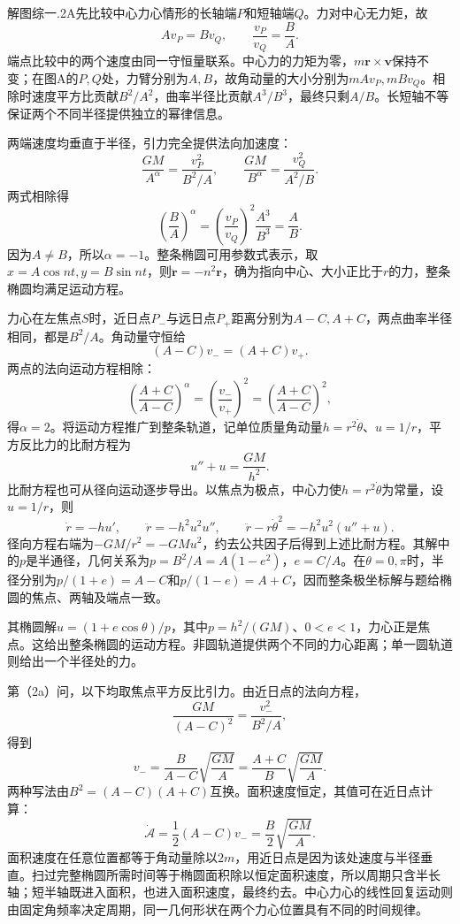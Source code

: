 \documentclass[UTF8,fontset=fandol,a4paper,11pt]{ctexart}
\begin{document}
解图综一.2A先比较中心力心情形的长轴端$P$和短轴端$Q$。力对中心无力矩，故
\[
Av_P=Bv_Q,\qquad \frac{v_P}{v_Q}=\frac BA.
\]
端点比较中的两个速度由同一守恒量联系。中心力的力矩为零，$m\boldsymbol r\times\boldsymbol v$保持不变；在图A的$P,Q$处，力臂分别为$A,B$，故角动量的大小分别为$mAv_P,mBv_Q$。相除时速度平方比贡献$B^2/A^2$，曲率半径比贡献$A^3/B^3$，最终只剩$A/B$。长短轴不等保证两个不同半径提供独立的幂律信息。

两端速度均垂直于半径，引力完全提供法向加速度：
\[
\frac{GM}{A^\alpha}=\frac{v_P^2}{B^2/A},\qquad
\frac{GM}{B^\alpha}=\frac{v_Q^2}{A^2/B}.
\]
两式相除得
\[
\left(\frac BA\right)^\alpha
=\left(\frac{v_P}{v_Q}\right)^2\frac{A^3}{B^3}
=\frac AB.
\]
因为$A\ne B$，所以$\boxed{\alpha=-1}$。整条椭圆可用参数式表示，取
$x=A\cos nt,y=B\sin nt$，则$\ddot{\boldsymbol r}=-n^2\boldsymbol r$，确为指向中心、大小正比于$r$的力，整条椭圆均满足运动方程。

力心在左焦点$S$时，近日点$P_-$与远日点$P_+$距离分别为$A-C,A+C$，两点曲率半径相同，都是$B^2/A$。角动量守恒给
\[
(A-C)v_-=(A+C)v_+.
\]
两点的法向运动方程相除：
\[
\left(\frac{A+C}{A-C}\right)^\alpha
=\left(\frac{v_-}{v_+}\right)^2
=\left(\frac{A+C}{A-C}\right)^2,
\]
得$\boxed{\alpha=2}$。将运动方程推广到整条轨道，记单位质量角动量$h=r^2\dot\theta$、$u=1/r$，平方反比力的比耐方程为
\[
u''+u=\frac{GM}{h^2}.
\]
比耐方程也可从径向运动逐步导出。以焦点为极点，中心力使$h=r^2\dot\theta$为常量，设$u=1/r$，则
\[
\dot r=-h u',\qquad \ddot r=-h^2u^2u'',\qquad
\ddot r-r\dot\theta^2=-h^2u^2(u''+u).
\]
径向方程右端为$-GM/r^2=-GMu^2$，约去公共因子后得到上述比耐方程。其解中的$p$是半通径，几何关系为$p=B^2/A=A(1-e^2)$，$e=C/A$。在$\theta=0,\pi$时，半径分别为$p/(1+e)=A-C$和$p/(1-e)=A+C$，因而整条极坐标解与题给椭圆的焦点、两轴及端点一致。

其椭圆解$u=(1+e\cos\theta)/p$，其中$p=h^2/(GM)$、$0<e<1$，力心正是焦点。这给出整条椭圆的运动方程。非圆轨道提供两个不同的力心距离；单一圆轨道则给出一个半径处的力。

第（2a）问，以下均取焦点平方反比引力。由近日点的法向方程，
\[
\frac{GM}{(A-C)^2}=\frac{v_-^2}{B^2/A},
\]
得到
\[
\boxed{v_-=\frac B{A-C}\sqrt{\frac{GM}{A}}
=\frac{A+C}{B}\sqrt{\frac{GM}{A}}}.
\]
两种写法由$B^2=(A-C)(A+C)$互换。面积速度恒定，其值可在近日点计算：
\[
\dot{\mathcal A}=\frac12(A-C)v_-=\frac B2\sqrt{\frac{GM}{A}}.
\]
面积速度在任意位置都等于角动量除以$2m$，用近日点是因为该处速度与半径垂直。扫过完整椭圆所需时间等于椭圆面积除以恒定面积速度，所以周期只含半长轴；短半轴既进入面积，也进入面积速度，最终约去。中心力心的线性回复运动则由固定角频率决定周期，同一几何形状在两个力心位置具有不同的时间规律。
\end{document}
